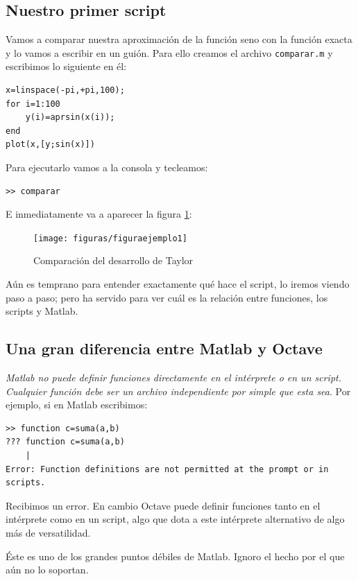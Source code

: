 \subsection{Nuestro primer script}

Vamos a comparar nuestra aproximación de la función seno con la
función exacta y lo vamos a escribir en un guión. Para ello creamos el
archivo \texttt{comparar.m} y escribimos lo siguiente en él:

\begin{lstlisting}
x=linspace(-pi,+pi,100);
for i=1:100
    y(i)=aprsin(x(i));
end
plot(x,[y;sin(x)])
\end{lstlisting}
Para ejecutarlo vamos a la consola y tecleamos:

\begin{lstlisting}
>> comparar
\end{lstlisting}
E inmediatamente va a aparecer la figura \ref{cap:figura-ejemplo1}:


\begin{figure}[h]
  \centering{}\texttt{[image: figuras/figuraejemplo1]}


  \caption{\label{cap:figura-ejemplo1}Comparación del desarrollo de
    Taylor}
\end{figure}


Aún es temprano para entender exactamente qué hace el script, lo
iremos viendo paso a paso; pero ha servido para ver cuál es la
relación entre funciones, los scripts y Matlab.


\subsection{Una gran diferencia entre Matlab y Octave}

\emph{Matlab no puede definir funciones directamente en el intérprete
o en un script.  Cualquier función debe ser un archivo independiente
por simple que esta sea}. Por ejemplo, si en Matlab escribimos:

\begin{lstlisting}
>> function c=suma(a,b)
??? function c=suma(a,b)
    |
Error: Function definitions are not permitted at the prompt or in scripts.
\end{lstlisting}
Recibimos un error.  En cambio Octave puede definir funciones tanto
en el intérprete como en un script, algo que dota a este intérprete
alternativo de algo más de versatilidad.

Éste es uno de los grandes puntos débiles de Matlab. Ignoro
el hecho por el que aún no lo soportan.

